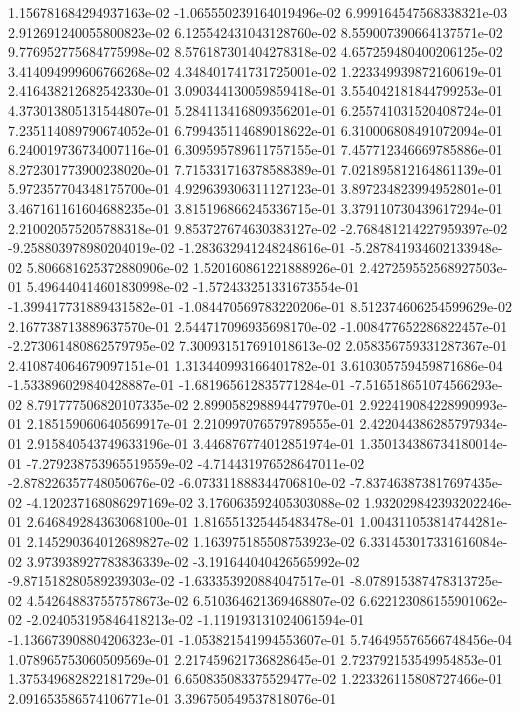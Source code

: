 1.156781684294937163e-02
-1.065550239164019496e-02
6.999164547568338321e-03
2.912691240055800823e-02
6.125542431043128760e-02
8.559007390664137571e-02
9.776952775684775998e-02
8.576187301404278318e-02
4.657259480400206125e-02
3.414094999606766268e-02
4.348401741731725001e-02
1.223349939872160619e-01
2.416438212682542330e-01
3.090344130059859418e-01
3.554042181844799253e-01
4.373013805131544807e-01
5.284113416809356201e-01
6.255741031520408724e-01
7.235114089790674052e-01
6.799435114689018622e-01
6.310006808491072094e-01
6.240019736734007116e-01
6.309595789611757155e-01
7.457712346669785886e-01
8.272301773900238020e-01
7.715331716378588389e-01
7.021895812164861139e-01
5.972357704348175700e-01
4.929639306311127123e-01
3.897234823994952801e-01
3.467161161604688235e-01
3.815196866245336715e-01
3.379110730439617294e-01
2.210020575205788318e-01
9.853727674630383127e-02
-2.768481214227959397e-02
-9.258803978980204019e-02
-1.283632941248248616e-01
-5.287841934602133948e-02
5.806681625372880906e-02
1.520160861221888926e-01
2.427259552568927503e-01
5.496440414601830998e-02
-1.572433251331673554e-01
-1.399417731889431582e-01
-1.084470569783220206e-01
8.512374606254599629e-02
2.167738713889637570e-01
2.544717096935698170e-02
-1.008477652286822457e-01
-2.273061480862579795e-02
7.300931517691018613e-02
2.058356759331287367e-01
2.410874064679097151e-01
1.313440993166401782e-01
3.610305759459871686e-04
-1.533896029840428887e-01
-1.681965612835771284e-01
-7.516518651074566293e-02
8.791777506820107335e-02
2.899058298894477970e-01
2.922419084228990993e-01
2.185159060640569917e-01
2.210997076579789555e-01
2.422044386285797934e-01
2.915840543749633196e-01
3.446876774012851974e-01
1.350134386734180014e-01
-7.279238753965519559e-02
-4.714431976528647011e-02
-2.878226357748050676e-02
-6.073311888344706810e-02
-7.837463873817697435e-02
-4.120237168086297169e-02
3.176063592405303088e-02
1.932029842393202246e-01
2.646849284363068100e-01
1.816551325445483478e-01
1.004311053814744281e-01
2.145290364012689827e-02
1.163975185508753923e-02
6.331453017331616084e-02
3.973938927783836339e-02
-3.191644040426565992e-02
-9.871518280589239303e-02
-1.633353920884047517e-01
-8.078915387478313725e-02
4.542648837557578673e-02
6.510364621369468807e-02
6.622123086155901062e-02
-2.024053195846418213e-02
-1.119193131024061594e-01
-1.136673908804206323e-01
-1.053821541994553607e-01
5.746495576566748456e-04
1.078965753060509569e-01
2.217459621736828645e-01
2.723792153549954853e-01
1.375349682822181729e-01
6.650835083375529477e-02
1.223326115808727466e-01
2.091653586574106771e-01
3.396750549537818076e-01
